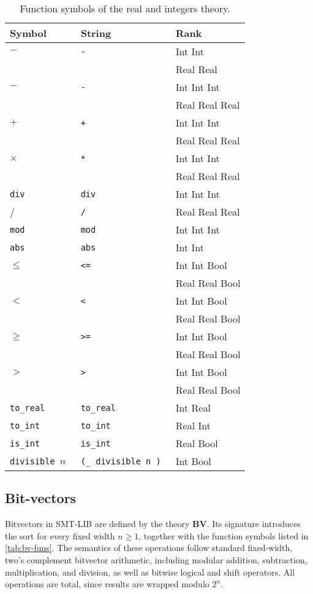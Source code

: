\begin{table}
\centering
\begin{tabular}{lll}
\toprule
\textbf{Symbol} & \textbf{String} & \textbf{Rank} \\
\midrule
$-$ & \tt{-} & Int Int \\
    &            & Real Real \\
$-$ & \tt{-} & Int Int Int \\
    &            & Real Real Real \\
$+$ & \tt{+} & Int Int Int \\
    &            & Real Real Real \\
$\times$ & \tt{*} & Int Int Int \\
    &               & Real Real Real \\
\tt{div} & \tt{div} & Int Int Int \\
/ & \tt{/} & Real Real Real \\
\tt{mod} & \tt{mod} & Int Int Int \\
\tt{abs} & \tt{abs} & Int Int \\
$\leq$ & \tt{<=} & Int Int Bool \\
    &                & Real Real Bool \\
$<$ & \tt{<} & Int Int Bool \\
    &             & Real Real Bool \\
$\geq$ & \tt{>=} & Int Int Bool \\
    &               & Real Real Bool \\
$>$ & \tt{>} & Int Int Bool \\
    &             & Real Real Bool \\
\tt{to\_real} & \tt{to\_real} & Int Real \\
\tt{to\_int}  & \tt{to\_int} & Real Int \\
\tt{is\_int}  & \tt{is\_int} & Real Bool \\
\tt{divisible} $n$ & \tt{(\_ divisible n )} & Int Bool \\
\bottomrule
\end{tabular}
\caption{Function symbols of the real and integers theory.}
\label{tab:real-int-funs}
\end{table}


\subsection{Bit-vectors}

Bitvectors in SMT-LIB are defined by the theory \textbf{BV}.
Its signature introduces the sort  for every fixed width $n \geq 1$, together with the function symbols listed in \cref{tab:bv-funs}.
The semantics of these operations follow standard fixed-width, two's complement bitvector arithmetic, including modular addition, subtraction, multiplication, and division, as well as bitwise logical and shift operators.
All operations are total, since results are wrapped modulo $2^n$.

